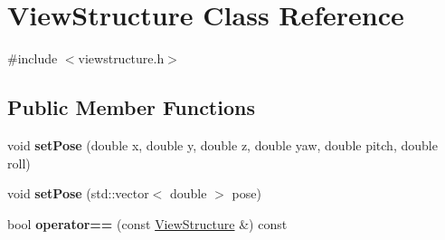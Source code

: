 \hypertarget{classViewStructure}{}\section{View\+Structure Class Reference}
\label{classViewStructure}


{\ttfamily \#include $<$viewstructure.\+h$>$}

\subsection*{Public Member Functions}
\begin{DoxyCompactItemize}
\item 
void {\bfseries set\+Pose} (double x, double y, double z, double yaw, double pitch, double roll)\hypertarget{classViewStructure_a0b13fbbc9488923d144590e2ae3c55b4}{}\label{classViewStructure_a0b13fbbc9488923d144590e2ae3c55b4}

\item 
void {\bfseries set\+Pose} (std\+::vector$<$ double $>$ pose)\hypertarget{classViewStructure_ad3ae844f74503787846c4fcff13edc34}{}\label{classViewStructure_ad3ae844f74503787846c4fcff13edc34}

\item 
bool {\bfseries operator==} (const \hyperlink{classViewStructure}{View\+Structure} \&) const \hypertarget{classViewStructure_aca11fe4eb7ebb8b4c960a9c36bd27af0}{}\label{classViewStructure_aca11fe4eb7ebb8b4c960a9c36bd27af0}

\end{DoxyCompactItemize}

